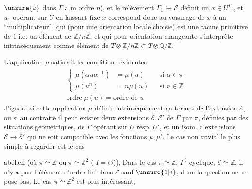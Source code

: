 

\(\unsure{u}\) dans \(\Gamma\) a \(\overline{\mathrm m}\) ordre \(n\)),
et le relèvement \(\Gamma_1\hookrightarrow\mathcal E\) définit un
\(x\in U^{\Gamma_1}\),  et \(u_1\) opérant sur \(U\)
en laissant fixe \(x\) correspond donc au voisinage de \(x\) à un
``multiplicateur'', qui (pour une orientation locale choisie) est une
racine primitive  de \(1\) i.e. un élément de
\(\mathbb Z/n\mathbb Z\), et qui pour orientation changeante
s'interprète intrinsèquement comme élément de
\(T\otimes\mathbb Z/n\mathbb Z
\subset T\otimes\mathbb Q/\mathbb Z\).

L'application \(\mu\) satisfait les conditions évidentes
\[
\begin{gathered}
\left\{
\begin{aligned}
\mu(\alpha u\alpha^{-1})&=\mu(u) &&\text{si }\alpha\in\pi\\
\mu(u^n)&=n\mu(u) &&\text{si }n\in\mathbb Z
\end{aligned}
\right.\\
\text{ordre }\mu(u)=\text{ordre de }u
\end{gathered}
\]
J'ignore si cette application \(\mu\) 
 définir intrinsèquement en termes de l'extension
\(\mathcal E\), ou si au contraire il peut exister deux extensions
 \(\mathcal E,\mathcal E'\) de \(\Gamma\) par \(\pi\),
définies par des situations géométriques, de \(\Gamma\) opérant sur
\(U\) resp. \(U'\), et un isom. d'extensions
\(\mathcal E\longrightarrow\mathcal E'\) qui ne soit compatible avec
les fonctions \(\mu,\mu'\).
Le cas non trivial le plus simple à regarder est le cas



abélien (où \(\pi\simeq\mathbb Z\)
ou \(\pi\simeq\mathbb Z^2\) ( \(I=\varnothing\))),
Dans le  cas
 \(\pi\simeq\mathbb Z\), 
\(\Gamma^0\) cyclique, \(\mathcal E\simeq\mathbb Z\),
il n'y a pas d'élément d'ordre fini dans \(\mathcal E\) sauf
\(\unsure{1|e}\), donc la question ne se pose pas.
Le cas \(\pi\simeq\mathbb Z^2\) est plus intéressant,

